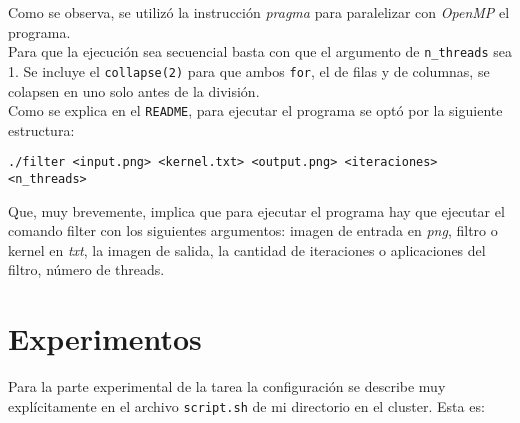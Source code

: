 \documentclass[letterpaper,10pt]{article}
\begin{document}
Como se observa, se utilizó la instrucción \textit{pragma} para paralelizar con \textit{OpenMP} el programa.\\

Para que la ejecución sea secuencial basta con que el argumento de \texttt{n\_threads} sea 1. Se incluye el \texttt{collapse(2)} para que ambos \texttt{for}, el de filas y de columnas, se colapsen en uno solo antes de la división.\\

Como se explica en el \texttt{README}, para ejecutar el programa se optó por la siguiente estructura:
\begin{center}
\texttt{./filter <input.png> <kernel.txt> <output.png> <iteraciones> <n\_threads>}
\end{center}

Que, muy brevemente, implica que para ejecutar el programa hay que ejecutar el comando filter con los siguientes argumentos: imagen de entrada en \textit{png}, filtro o kernel en \textit{txt}, la imagen de salida, la cantidad de iteraciones o aplicaciones del filtro, número de threads.


\section{Experimentos}

Para la parte experimental de la tarea la configuración se describe muy explícitamente en el archivo \texttt{script.sh} de mi directorio en el cluster. Esta es:
\end{document}

